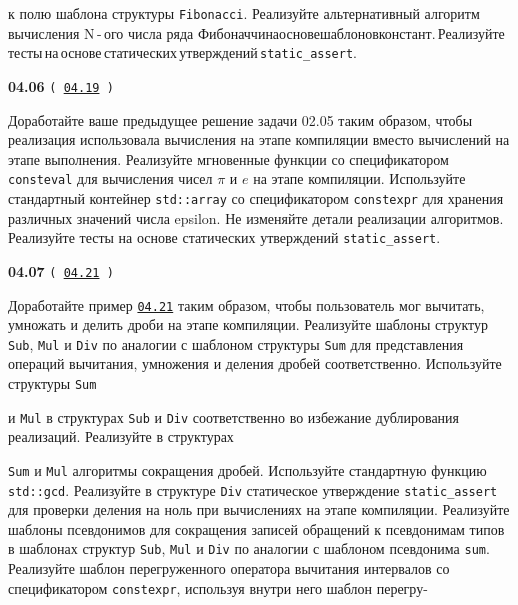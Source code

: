 \documentclass[a4paper,12pt]{article}
\begin{document}
к полю шаблона структуры \lstinline{Fibonacci}. Реализуйте альтернативный алгоритм вычисления N\,-\,ого числа ряда Фибоначчи\:на\:основе\:шаблонов\:констант.\,Реализуйте\,тесты\,на\,основе\,статических\,утверждений\,\lstinline{static_assert}.

\bigskip

{\large \textbf{04.06} \texttt{(\,\href{https://github.com/i-s-m-mipt/Education/blob/master/projects/examples/source/04.19.cpp}{04.19}\,)}}

\bigskip

Доработайте ваше предыдущее решение задачи 02.05 таким образом, чтобы реализация использовала вычисления на этапе компиляции вместо вычислений на этапе выполнения. Реализуйте мгновенные функции со спецификатором \lstinline{consteval} для вычисления чисел $\pi$ и $e$ на этапе компиляции. Используйте стандартный контейнер \lstinline{std::array} со спецификатором \lstinline{constexpr} для хранения различных значений числа epsilon. Не изменяйте детали реализации алгоритмов. Реализуйте тесты на основе статических утверждений \lstinline{static_assert}.

\bigskip

{\large \textbf{04.07} \texttt{(\,\href{https://github.com/i-s-m-mipt/Education/blob/master/projects/examples/source/04.21.cpp}{04.21}\,)}}

\bigskip

Доработайте пример \href{https://github.com/i-s-m-mipt/Education/blob/master/projects/examples/source/04.21.cpp}{\texttt{04.21}} таким образом, чтобы пользователь мог вычитать, умножать и делить дроби на этапе компиляции. Реализуйте шаблоны структур \lstinline{Sub}, \lstinline{Mul} и \lstinline{Div} по аналогии с шаблоном структуры \lstinline{Sum} для представления операций вычитания, умножения и деления дробей соответственно. Используйте структуры \lstinline{Sum} 

и \lstinline{Mul} в структурах \lstinline{Sub} и \lstinline{Div} соответственно во избежание дублирования реализаций. Реализуйте в структурах 

\lstinline{Sum} и \lstinline{Mul} алгоритмы сокращения дробей. Используйте стандартную функцию \lstinline{std::gcd}. Реализуйте в структуре \lstinline{Div} статическое утверждение \lstinline{static_assert} для проверки деления на ноль при вычислениях на этапе компиляции. Реализуйте шаблоны псевдонимов для сокращения записей обращений к псевдонимам типов в шаблонах структур \lstinline{Sub}, \lstinline{Mul} и \lstinline{Div} по аналогии с шаблоном псевдонима \lstinline{sum}. Реализуйте шаблон перегруженного оператора вычитания интервалов со спецификатором \lstinline{constexpr}, используя внутри него шаблон перегру-
\end{document}
